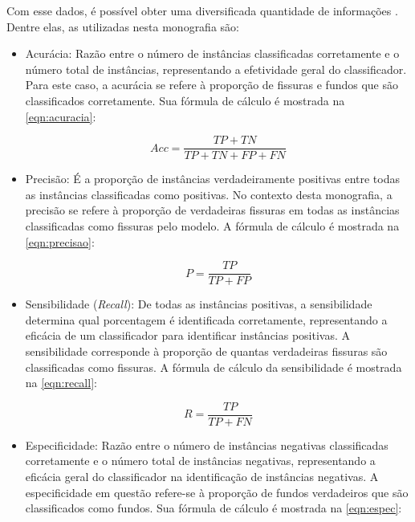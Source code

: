 Com esse dados, é possível obter uma diversificada quantidade de informações \cite{geron2019hands}.
Dentre elas, as utilizadas nesta monografia são:

\begin{itemize}
\item Acurácia: 
Razão entre o número de instâncias classificadas corretamente e o número total de instâncias, representando a efetividade geral do classificador. 
Para este caso, a acurácia se refere à proporção de fissuras e fundos que são classificados corretamente. Sua fórmula de cálculo é mostrada na \autoref{eqn:acuracia}:

\begin{equation}
\label{eqn:acuracia}
Acc = \frac{TP + TN}{TP + TN + FP + FN}
\end{equation}

\item
Precisão: 
É a proporção de instâncias verdadeiramente positivas entre todas as instâncias classificadas como positivas. 
No contexto desta monografia, a precisão se refere à proporção de verdadeiras fissuras em todas as instâncias classificadas como fissuras pelo modelo. 
A fórmula de cálculo é mostrada na \autoref{eqn:precisao}:

\begin{equation}
\label{eqn:precisao}
P = \frac{TP}{TP + FP}
\end{equation}

\item
Sensibilidade (\textit{Recall}): 
De todas as instâncias positivas, a sensibilidade determina qual porcentagem é identificada corretamente, representando a eficácia de um classificador para identificar instâncias positivas. 
A sensibilidade corresponde à proporção de quantas verdadeiras fissuras são classificadas como fissuras. 
A fórmula de cálculo da sensibilidade é mostrada na \autoref{eqn:recall}:

\begin{equation}
\label{eqn:recall}
R = \frac{TP}{TP + FN}
\end{equation}

\item
Especificidade: 
Razão entre o número de instâncias negativas classificadas corretamente e o número total de instâncias negativas, representando a eficácia geral do classificador na identificação de instâncias negativas. 
A especificidade em questão refere-se à proporção de fundos verdadeiros que são classificados como fundos. 
Sua fórmula de cálculo é mostrada na \autoref{eqn:espec}:


\end{itemize}
